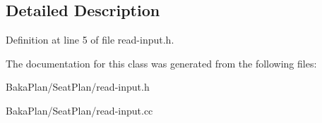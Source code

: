 \subsection{Detailed Description}


Definition at line 5 of file read-\/input.\-h.



The documentation for this class was generated from the following files\-:\begin{DoxyCompactItemize}
\item 
Baka\-Plan/\-Seat\-Plan/read-\/input.\-h\item 
Baka\-Plan/\-Seat\-Plan/read-\/input.\-cc\end{DoxyCompactItemize}
